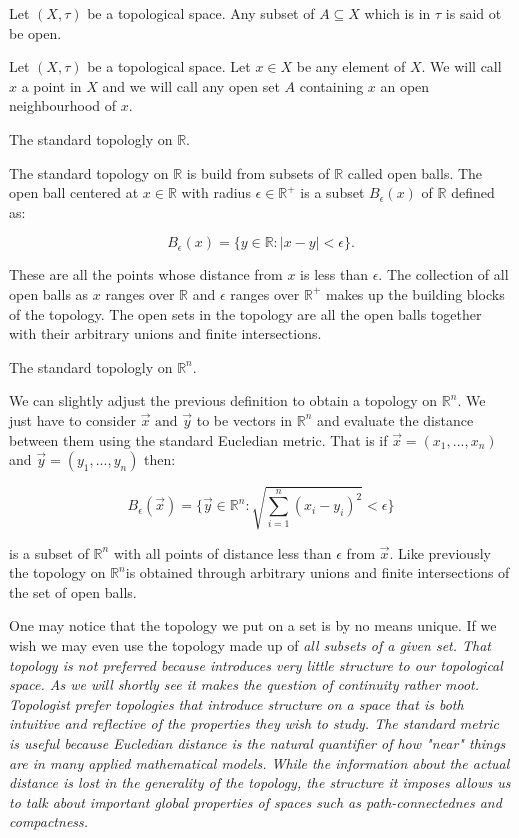 \begin{defn} Let $(X, \tau)$ be a topological space. Any subset of $A \subseteq X$ which is in $\tau$ is said ot be open.  \end{defn}

\begin{defn} Let $(X, \tau)$ be a topological space. Let $x \in X$ be any element of $X$. We will call $x$ a point in $X$ and we will call any open set $A$ containing $x$ an open neighbourhood of $x$.  \end{defn}

\begin{ex} The standard topologly on $\mathbb{R}$.  \end{ex}

The standard topology on $\mathbb{R}$ is build from subsets of $\mathbb{R}$ called open balls. The open ball centered at $x \in \mathbb{R}$ with radius $\epsilon \in \mathbb{R}^+$ is a subset $B_\epsilon(x)$ of $\mathbb{R}$ defined as:

$$ B_\epsilon(x) = \{y \in \mathbb{R} : |x - y| < \epsilon \} .$$

These are all the points whose distance from $x$ is less than $\epsilon$. The collection of all open balls as $x$ ranges over $\mathbb{R}$ and $\epsilon$ ranges over $\mathbb{R}^+$ makes up the building blocks of the topology. The open sets in the topology are all the open balls together with their arbitrary unions and finite intersections.


\begin{ex} The standard topologly on $\mathbb{R}^n$.  \end{ex}

We can slightly adjust the previous definition to obtain a topology on $\mathbb{R}^n$. We just have to consider $\vec{x} \text{ and } \vec{y}$ to be vectors in $\mathbb{R}^n$ and evaluate the distance between them using the standard Eucledian metric. That is if $\vec{x} = (x_1, ..., x_n)$ and $\vec{y} = (y_1, ..., y_n)$ then:

$$ B_\epsilon(\vec{x}) = \{\vec{y} \in \mathbb{R}^n : \sqrt{\sum_{i = 1}^{n}{(x_i - y_i) ^ 2}} < \epsilon \} $$

is a subset of $\mathbb{R}^n$ with all points of distance less than $\epsilon$ from $\vec{x}$. Like previously the topology on $\mathbb{R}^n$is obtained through arbitrary unions and finite intersections of the set of open balls.


One may notice that the topology we put on a set is by no means unique. If we wish we may even use the topology made up of \em all \em subsets of a given set. That topology is not preferred because introduces very little structure to our topological space. As we will shortly see it makes the question of continuity rather moot. Topologist prefer topologies that introduce structure on a space that is both intuitive and reflective of the properties they wish to study. The standard metric is useful because Eucledian distance is the natural quantifier of how "near" things are in many applied mathematical models. While the information about the actual distance is lost in the generality of the topology, the structure it imposes allows us to talk about important global properties of spaces such as path-connectednes and compactness.


